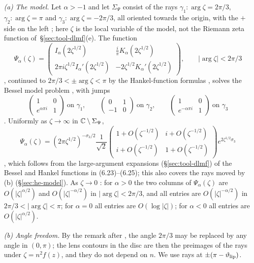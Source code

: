 \emph{(a) The model.} Let $\alpha>-1$ and let $\Sigma_\Psi$ consist of the rays $\gamma_1:\arg\zeta=2\pi/3$,
$\gamma_2:\arg\zeta=\pi$ and $\gamma_3:\arg\zeta=-2\pi/3$, all oriented towards the origin, with the $+$ side on the
left \cite[Figure~3]{KMVV}; here $\zeta$ is the local variable of the model, not the Riemann zeta function of~\S\ref{sec:tool-dlmf}(e). The function
\[
  \Psi_\alpha(\zeta)=\begin{pmatrix}I_\alpha(2\zeta^{1/2}) & \frac i\pi K_\alpha(2\zeta^{1/2})\\[1mm]
  2\pi i\zeta^{1/2}I_\alpha'(2\zeta^{1/2}) & -2\zeta^{1/2}K_\alpha'(2\zeta^{1/2})\end{pmatrix},\qquad|\arg\zeta|<2\pi/3
\]
\cite[(6.23)]{KMVV}, continued to $2\pi/3<\pm\arg\zeta<\pi$ by the Hankel-function formulas \cite[(6.24)--(6.25)]{KMVV},
solves the Bessel model problem \cite[Theorem~6.3]{KMVV}, with jumps
\[
  \begin{pmatrix}1&0\\e^{\alpha\pi i}&1\end{pmatrix}\ \text{on }\gamma_1,\qquad
  \begin{pmatrix}0&1\\-1&0\end{pmatrix}\ \text{on }\gamma_2,\qquad
  \begin{pmatrix}1&0\\e^{-\alpha\pi i}&1\end{pmatrix}\ \text{on }\gamma_3
\]
\cite[(6.16)--(6.18)]{KMVV}. Uniformly as $\zeta\to\infty$ in $\mathbb{C}\setminus\Sigma_\Psi$,
\[
  \Psi_\alpha(\zeta)=(2\pi\zeta^{1/2})^{-\sigma_3/2}\frac1{\sqrt2}
  \begin{pmatrix}1+O(\zeta^{-1/2})&i+O(\zeta^{-1/2})\\ i+O(\zeta^{-1/2})&1+O(\zeta^{-1/2})\end{pmatrix}e^{2\zeta^{1/2}\sigma_3}
\]
\cite[(6.28)]{KMVV}, which follows from the large-argument expansions (\S\ref{sec:tool-dlmf}) of the Bessel and Hankel
functions in (6.23)--(6.25); this also covers the rays moved by (b) (\S\ref{sec:he-model}). As $\zeta\to0$
\cite[(6.19)--(6.21)]{KMVV}: for $\alpha>0$ the two columns of $\Psi_\alpha(\zeta)$ are $O(|\zeta|^{\alpha/2})$ and
$O(|\zeta|^{-\alpha/2})$ in $|\arg\zeta|<2\pi/3$, and all entries are $O(|\zeta|^{-\alpha/2})$ in $2\pi/3<|\arg\zeta|<\pi$;
for $\alpha=0$ all entries are $O(\log|\zeta|)$; for $\alpha<0$ all entries are $O(|\zeta|^{\alpha/2})$.

\emph{(b) Angle freedom.} By the remark after \cite[(6.21)]{KMVV}, the angle $2\pi/3$ may be replaced by any angle in
$(0,\pi)$; the lens contours in the disc are then the preimages of the rays under $\zeta=n^2f(z)$, and they do not
depend on $n$. We use rays at $\pm(\pi-\vartheta_{\mathrm{lip}})$.

